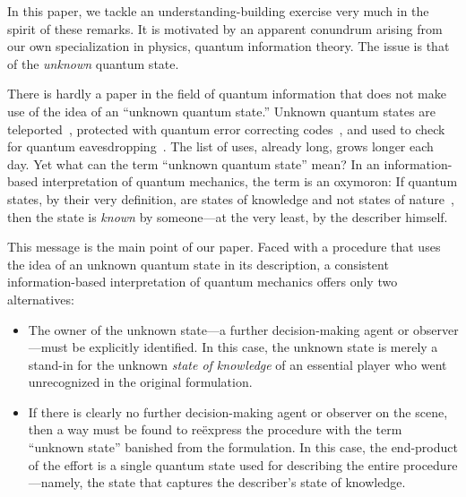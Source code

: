 In this paper, we tackle an understanding-building exercise very
much in the spirit of these remarks.  It is motivated by an
apparent conundrum arising from our own specialization in physics,
quantum information theory.  The issue is that of the {\it
unknown\/} quantum state.

There is hardly a paper in the field of quantum information that
does not make use of the idea of an ``unknown quantum state.''
Unknown quantum states are
teleported~\cite{Bennett1993,Experiments1998}, protected with
quantum error correcting codes~\cite{Shor1995,Steane1996}, and used
to check for quantum
eavesdropping~\cite{Bennett1984,CryptoExperiments}.  The list of
uses, already long, grows longer each day.  Yet what can the term
``unknown quantum state'' mean? In an information-based
interpretation of quantum mechanics, the term is an oxymoron:  If
quantum states, by their very definition, are states of knowledge
and not states of nature~\cite{Hartle1968}, then the state is {\it
known\/} by someone---at the very least, by the describer himself.

This message is the main point of our paper.
Faced with a procedure that uses the
idea of an unknown quantum state in its description, a consistent
information-based interpretation of quantum mechanics offers only
two alternatives:
\begin{itemize}
\item
The owner of the unknown state---a further decision-making agent or
observer---must be explicitly identified.  In this case, the unknown
state is merely a stand-in for the unknown {\it state of
knowledge\/} of an essential player who went unrecognized in the
original formulation.
\item
If there is clearly no further decision-making agent or observer
on the scene, then a way must be found to re\"express the
procedure with the term ``unknown state'' banished from the
formulation. In this case, the end-product of the effort is a
single quantum state used for describing the entire
procedure---namely, the state that captures the describer's state
of knowledge.
\end{itemize}

